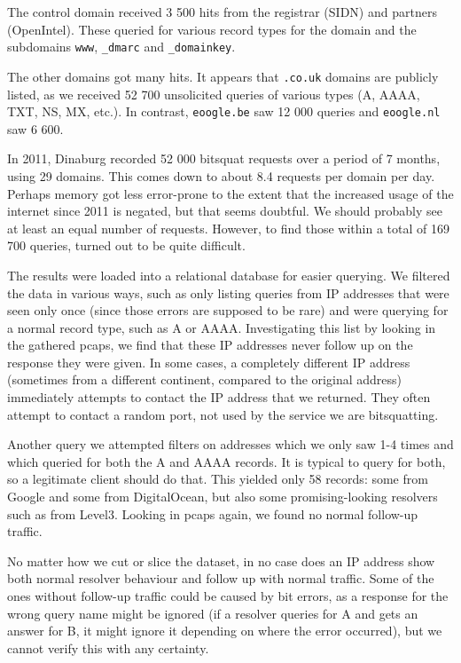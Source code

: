 \documentclass[conference]{IEEEtran}
\begin{document}
The control domain received 3 500 hits from the registrar (SIDN) and partners
(OpenIntel). These queried for various record types for the domain and the
subdomains \texttt{www}, \texttt{\_dmarc} and \texttt{\_domainkey}.

The other domains got many hits. It appears that \texttt{.co.uk} domains are
publicly listed, as we received 52 700 unsolicited queries of various types (A,
AAAA, TXT, NS, MX, etc.). In contrast, \texttt{eoogle.be} saw 12 000 queries
and \texttt{eoogle.nl} saw 6 600.

In 2011, Dinaburg\cite{dinaburg2011bitsquatting} recorded 52 000 bitsquat
requests over a period of 7 months, using 29 domains. This comes down to about
8.4 requests per domain per day. Perhaps memory got less error-prone to the
extent that the increased usage of the internet since 2011 is negated, but that
seems doubtful. We should probably see at least an equal number of requests.
However, to find those within a total of 169 700 queries, turned out to be
quite difficult.

The results were loaded into a relational database for easier querying. We
filtered the data in various ways, such as only listing queries from IP
addresses that were seen only once (since those errors are supposed to be rare)
and were querying for a normal record type, such as A or AAAA. Investigating
this list by looking in the gathered pcaps, we find that these IP addresses
never follow up on the response they were given. In some cases, a completely
different IP address (sometimes from a different continent, compared to the
original address) immediately attempts to contact the IP address that we
returned. They often attempt to contact a random port, not used by the service
we are bitsquatting.

Another query we attempted filters on addresses which we only saw 1-4 times and
which queried for both the A and AAAA records. It is typical to query for both,
so a legitimate client should do that. This yielded only 58 records: some from
Google and some from DigitalOcean, but also some promising-looking resolvers
such as from Level3. Looking in pcaps again, we found no normal follow-up
traffic.

No matter how we cut or slice the dataset, in no case does an IP address show
both normal resolver behaviour and follow up with normal traffic. Some of the
ones without follow-up traffic could be caused by bit errors, as a response for
the wrong query name might be ignored (if a resolver queries for A and gets an
answer for B, it might ignore it depending on where the error occurred), but
we cannot verify this with any certainty.
\end{document}
